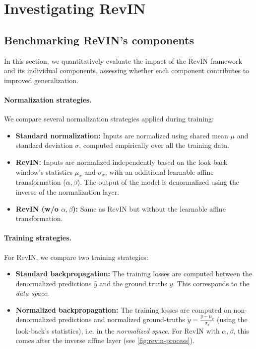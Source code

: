 \section{Investigating RevIN} \label{ablation-studies}

\subsection{Benchmarking ReVIN's components} \label{quantitative}

In this section, we quantitatively evaluate the impact of the RevIN framework and its individual components, assessing whether each component contributes to improved generalization.


\paragraph{Normalization strategies.}
We compare several normalization strategies applied during training:
\begin{itemize}
    \item \textbf{Standard normalization:} Inputs are normalized using shared mean $\mu$ and standard deviation $\sigma$, computed empirically over all the training data.
    \item \textbf{RevIN:} Inputs are normalized independently based on the look-back window's statistics $\mu_x$ and $\sigma_x$, with an additional learnable affine transformation ($\alpha,\beta$). The output of the model is denormalized using the inverse of the normalization layer.
    \item \textbf{RevIN (w/o $\alpha,\beta$):} Same as RevIN but without the learnable affine transformation.
\end{itemize}

\paragraph{Training strategies.} For RevIN, we compare two training strategies:
\begin{itemize}
    \item \textbf{Standard backpropagation:} The training losses are computed between the denormalized predictions $\hat{y}$ and the ground truths $y$. This corresponds to the \textit{data space}.
    \item \textbf{Normalized backpropagation:} The training losses are computed on non-denormalized predictions and normalized ground-truths $\tilde{y}=\frac{y- \mu_x}{\sigma_x}$ (using the look-back's statistics), i.e. in the \textit{normalized space}. For RevIN with $\alpha,\beta$, this comes after the inverse $\textrm{affine}$ layer (see \cref{fig:revin-process}).
\end{itemize}



